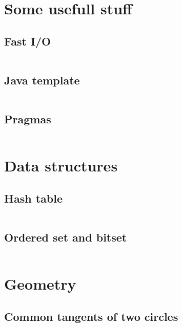 \documentclass{article}
\begin{document}
\tableofcontents


\section{Some usefull stuff}
\subsection{Fast I/O}
\inputminted[mathescape, breaklines, breakafter=(, tabsize=2, frame=lines, showtabs, tab=|\ , tabcolor=lightgray]{c++}{./basic/fast-io/io.cpp}
\subsection{Java template}
\inputminted[mathescape, breaklines, breakafter=(, tabsize=2, frame=lines, showtabs, tab=|\ , tabcolor=lightgray]{java}{./basic/java-template/Template.java}
\subsection{Pragmas}
\inputminted[mathescape, breaklines, breakafter=(, tabsize=2, frame=lines, showtabs, tab=|\ , tabcolor=lightgray]{c++}{./basic/pragmas/opt.cpp}
\section{Data structures}
\subsection{Hash table}
\inputminted[mathescape, breaklines, breakafter=(, tabsize=2, frame=lines, showtabs, tab=|\ , tabcolor=lightgray]{c++}{./data-structures/hash-table/hash-table.cpp}
\subsection{Ordered set and bitset}
\inputminted[mathescape, breaklines, breakafter=(, tabsize=2, frame=lines, showtabs, tab=|\ , tabcolor=lightgray]{c++}{./data-structures/std/std.cpp}
\section{Geometry}
\subsection{Common tangents of two circles}
\inputminted[mathescape, breaklines, breakafter=(, tabsize=2, frame=lines, showtabs, tab=|\ , tabcolor=lightgray]{c++}{./geometry/common-tangents/common-tangents.cpp}
\end{document}
